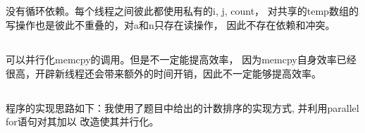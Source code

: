 \documentclass[UTF8]{article}
\begin{document}
\subsection{}
没有循环依赖。每个线程之间彼此都使用私有的i, j, count，
对共享的temp数组的写操作也是彼此不重叠的，对a和n只存在读操作，
因此不存在依赖和冲突。
\subsection{}
可以并行化memcpy的调用。但是不一定能提高效率，
因为memcpy自身效率已经很高，开辟新线程还会带来额外的时间开销，因此不一定能够提高效率。

\subsection{}
程序的实现思路如下：我使用了题目中给出的计数排序的实现方式, 并利用parallel for语句对其加以
改造使其并行化。
\end{document}
